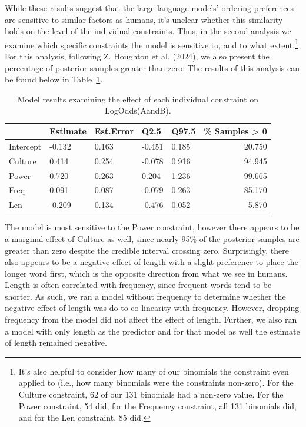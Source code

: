 \documentclass[
  10pt,
  nohyperref]{acl}
\begin{document}
While these results suggest that the large language models' ordering
preferences are sensitive to similar factors as humans, it's unclear
whether this similarity holds on the level of the individual
constraints. Thus, in the second analysis we examine which specific
constraints the model is sensitive to, and to what extent.\footnote{It's
  also helpful to consider how many of our binomials the constraint even
  applied to (i.e., how many binomials were the constraints non-zero).
  For the Culture constraint, 62 of our 131 binomials had a non-zero
  value. For the Power constraint, 54 did, for the Frequency constraint,
  all 131 binomials did, and for the Len constraint, 85 did.} For this
analysis, following Z. Houghton et al. (2024), we also present the
percentage of posterior samples greater than zero. The results of this
analysis can be found below in Table~\ref{tbl-exp1m2}.

\begin{longtable}[]{@{}lllllr@{}}

\caption{\label{tbl-exp1m2}Model results examining the effect of each
individual constraint on LogOdds(AandB).}

\tabularnewline

\toprule\noalign{}
& Estimate & Est.Error & Q2.5 & Q97.5 & \% Samples \textgreater{} 0 \\
\midrule\noalign{}
\endhead
\bottomrule\noalign{}
\endlastfoot
Intercept & -0.132 & 0.163 & -0.451 & 0.185 & 20.750 \\
Culture & 0.414 & 0.254 & -0.078 & 0.916 & 94.945 \\
Power & 0.720 & 0.263 & 0.204 & 1.236 & 99.665 \\
Freq & 0.091 & 0.087 & -0.079 & 0.263 & 85.170 \\
Len & -0.209 & 0.134 & -0.476 & 0.052 & 5.870 \\

\end{longtable}

The model is most sensitive to the Power constraint, however there
appears to be a marginal effect of Culture as well, since nearly 95\% of
the posterior samples are greater than zero despite the credible
interval crossing zero. Surprisingly, there also appears to be a
negative effect of length with a slight preference to place the longer
word first, which is the opposite direction from what we see in humans.
Length is often correlated with frequency, since frequent words tend to
be shorter. As such, we ran a model without frequency to determine
whether the negative effect of length was do to co-linearity with
frequency. However, dropping frequency from the model did not affect the
effect of length. Further, we also ran a model with only length as the
predictor and for that model as well the estimate of length remained
negative.
\end{document}
